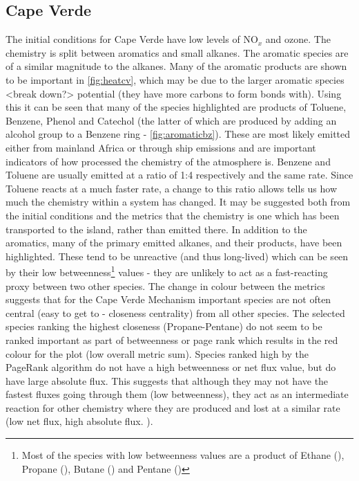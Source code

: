 \subsection*{Cape Verde}
The initial conditions for Cape Verde have low levels of NO$_x$ and ozone. The chemistry is split between aromatics and small alkanes. The aromatic species are of a similar magnitude to the alkanes. Many of the aromatic products are shown to be important in \autoref{fig:heatcv}, which may be due to the larger aromatic species <break down?> potential (they have more carbons to form bonds with). Using this it can be seen that many of the species highlighted are products of Toluene, Benzene, Phenol and Catechol (the latter of which are produced by adding an alcohol group to a Benzene ring - \autoref{fig:aromaticbz}). These are most likely emitted either from mainland Africa or through ship emissions and are important indicators of how processed the chemistry of the atmosphere is. Benzene and Toluene are usually emitted at a ratio of 1:4 respectively and the same rate. Since Toluene reacts at a much faster rate, a change to this ratio allows tells us how much the chemistry within a system has changed. It may be suggested both from the initial conditions and the metrics that the chemistry is one which has been transported to the island, rather than emitted there. In addition to the aromatics, many of the primary emitted alkanes, and their products, have been highlighted. These tend to be unreactive (and thus long-lived) which can be seen by their low betweenness\footnote{Most of the species with low betweenness values are a product of Ethane (), Propane (), Butane () and Pentane ()} values - they are unlikely to act as a fast-reacting proxy between two other species. The change in colour between the metrics suggests that for the Cape Verde Mechanism important species are not often central (easy to get to - closeness centrality) from all other species. The selected species ranking the highest closeness (Propane-Pentane) do not seem to be ranked important as part of betweenness or page rank which results in the red colour for the plot (low overall metric sum). Species ranked high by the PageRank algorithm do not have a high betweenness or net flux value, but do have large absolute flux. This suggests that although they may not have the fastest fluxes going through them (low betweenness), they act as an intermediate reaction for other chemistry where they are produced and lost at a similar rate (low net flux, high absolute flux. ). 


